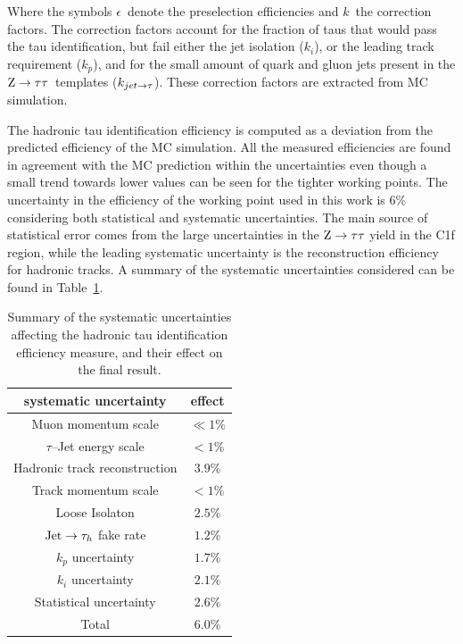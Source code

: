 Where the symbols $\epsilon$\ denote the preselection efficiencies and $k$\ the correction factors. The correction factors account for the fraction of taus that would pass the tau identification, but fail either the jet isolation ($k_i$), or the leading track requirement ($k_p$), and for the small amount of quark and gluon jets present in the $\mathrm{Z}\rightarrow\tau\tau$\ templates ($k_{jet \rightarrow \tau}$). These correction factors are extracted from MC simulation. 

The hadronic tau identification efficiency is computed as a deviation from the predicted efficiency of the MC simulation. All the measured efficiencies are found in agreement with the MC prediction within the uncertainties even though a small trend towards lower values can be seen for the tighter working points. The uncertainty in the efficiency of the working point used in this work is 6\% considering both statistical and systematic uncertainties. The main source of statistical error comes from the large uncertainties in the $\mathrm{Z}\rightarrow\tau\tau$ yield in the C1f region, while the leading systematic uncertainty is the reconstruction efficiency for hadronic tracks. A summary of the systematic uncertainties considered can be found in Table~\ref{tab:tau_eff_sys}.

\begin{table}
\begin{center}
\caption{Summary of the systematic uncertainties affecting the hadronic tau identification efficiency measure, and their effect on the final result.}
\begin{tabular}{|c|c|}
 \hline
 systematic uncertainty & effect \\
 \hline
Muon momentum scale & $\ll 1\%$ \\
$\tau$--Jet energy scale & $ < 1\%$ \\
Hadronic track reconstruction & $3.9\%$ \\
Track momentum scale & $< 1\%$ \\
Loose Isolaton & $2.5\%$ \\
$\mathrm{Jet}\rightarrow\tau_h$ fake rate & $1.2\%$ \\
$k_p$ uncertainty & $1.7\%$ \\
$k_i$ uncertainty & $2.1\%$ \\
Statistical uncertainty & $2.6\%$ \\
\hline
Total & $6.0\%$ \\
\hline
\end{tabular}
\end{center}
\label{tab:tau_eff_sys}
\end{table}


